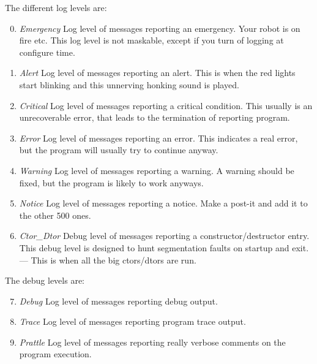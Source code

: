 The different log levels are:
\begin{enumerate}
\setcounter{enumi}{-1}
\item \emph{Emergency} Log level of messages reporting an emergency.
  Your robot is on fire etc. This log level is not maskable, except if
  you turn of logging at configure time.
\item \emph{Alert} Log level of messages reporting an alert. This is
  when the red lights start blinking and this unnerving honking sound
  is played.
\item \emph{Critical} Log level of messages reporting a critical
  condition. This usually is an unrecoverable error, that leads to
  the termination of reporting program.
\item \emph{Error} Log level of messages reporting an error.
  This indicates a real error, but the program will usually try to
  continue anyway.
\item \emph{Warning} Log level of messages reporting a warning.  A
  warning should be fixed, but the program is likely to work anyways.
\item \emph{Notice} Log level of messages reporting a notice. Make
  a post-it and add it to the other 500 ones.
\item \emph{Ctor\_Dtor} Debug level of messages reporting a
  constructor/destructor entry.  This debug level is designed to hunt
  segmentation faults on startup and exit. --- This is when all the big
  ctors/dtors are run.
\end{enumerate}

The debug levels are:
\begin{enumerate}
\setcounter{enumi}{6}
\item \emph{Debug} Log level of messages reporting debug output.
\item \emph{Trace} Log level of messages reporting program trace
  output.
\item \emph{Prattle} Log level of messages reporting really verbose
  comments on the program execution.
\end{enumerate}

